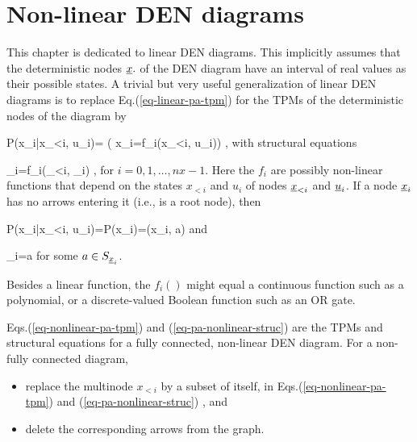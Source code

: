 \section{Non-linear DEN diagrams}
This chapter 
is dedicated to
linear DEN diagrams. This
implicitly
assumes that 
the deterministic
nodes ${\underline{x}}.$
of the 
DEN diagram have
an interval of
real values as their
possible states.
A trivial
but very useful
generalization
of linear DEN diagrams is to
replace Eq.(\ref{eq-linear-pa-tpm})
for the TPMs
of the
deterministic nodes
of the diagram by

\beq\color{blue}
P(x_i|x_{<i}, u_i)=
\indi(
x_i=f_i(x_{<i}, u_i))
\;,
\label{eq-nonlinear-pa-tpm}
\eeq
with structural equations

\beq
\rvx_i=f_i(\rvx_{<i}, \rvu_i)
\;,
\label{eq-pa-nonlinear-struc}
\eeq
for $i=0, 1, \ldots, nx-1$.
Here the $f_i$ are 
possibly non-linear
functions
that depend on
the states
$x_{<i}$ and $u_i$
of nodes ${\underline{x}}_{<i}$
and ${\underline{u}}_i$.
If a node ${\underline{x}}_i$
has no arrows
entering it (i.e., is
a root node), then

\beq\color{blue}
P(x_i|x_{<i}, u_i)=P(x_i)=\delta(x_i, a)
\eeq
and

\beq
\rvx_i=a
\eeq
for some $a\in S_{{\underline{x}}_i}$.


Besides a linear function, the
$f_i()$
might equal a
continuous function
such as a polynomial,
or a discrete-valued Boolean
function
such as an OR gate.


Eqs.(\ref{eq-nonlinear-pa-tpm})
and (\ref{eq-pa-nonlinear-struc})
are the TPMs and
structural equations
for a 
fully connected, non-linear DEN diagram.
For a non-fully connected 
diagram, 
\begin{itemize}
\item
replace the multinode $x_{<i}$
by a subset of itself,
in 
Eqs.(\ref{eq-nonlinear-pa-tpm})
and (\ref{eq-pa-nonlinear-struc})
,
and
\item
delete
the corresponding arrows
from the graph.
\end{itemize}

